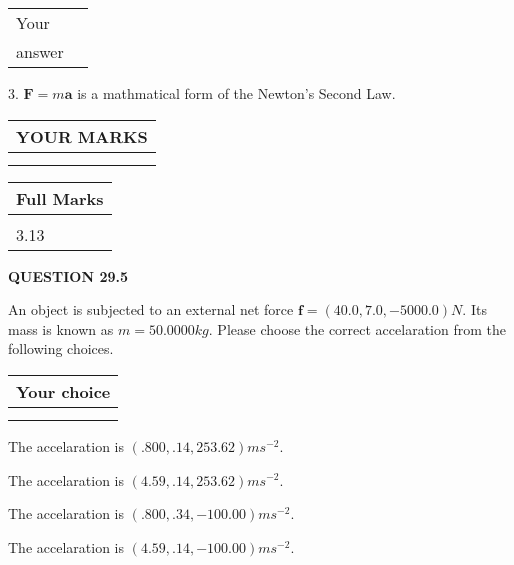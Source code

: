 \documentclass[12pt]{article}
\begin{document}
\noindent\begin{tabular}{|l|l|}\hline Your&\hspace{.2in} \\ answer&\hspace{.2in} \\ \hline \end{tabular}
3.  %
$\mathbf{F}=m\mathbf{a}$ is a mathmatical form of
the Newton's Second Law.
 

 
\vspace{0.3in}
  
\vspace{0.2in}
  
\noindent\begin{tabular}{|l|}
\hline
 YOUR MARKS  \\
\hline
 \\ 
 \\ 
\hline
\end{tabular}
\hspace{0.05in} \begin{tabular}{|l|}
\hline
 Full Marks  \\
\hline
 \\ 
3.13 \\
\hline
\end{tabular}
{\textbf{\Large{QUESTION
29.5 
}}}
  
  
 
 
An object is subjected to an external net force $\mathbf{f}=
(40.0 , 7.0 , -5000.0) N$.
Its mass is known as $m= %
50.0000 kg$. Please choose the
correct accelaration from the following choices.
 
  
  
\noindent\hspace{3.0in} \begin{tabular}{|l|}
\hline
Your choice \\
\hline
 \\ 
 \\ 
\hline
\end{tabular}
  
  
 
 
The accelaration is $  %
(
.800,
.14,
253.62)
ms^{-2} $.
 
 
The accelaration is $  %
(
4.59,
.14,
253.62)
ms^{-2} $.
 
 
The accelaration is $  %
(
.800,
.34,
-100.00)
ms^{-2} $.
 
 
The accelaration is $  %
(
4.59,
.14,
-100.00)
ms^{-2} $.
 
\end{document}
